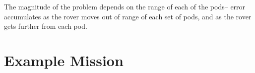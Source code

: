 \documentclass[10pt,letterpaper]{article}
\begin{document}
The magnitude of the problem depends on the range of each of the pods-- error accumulates as the rover moves out of range of each set of pods, and as the rover gets further from each pod. 




\newpage
\section{Example Mission}
\end{document}
